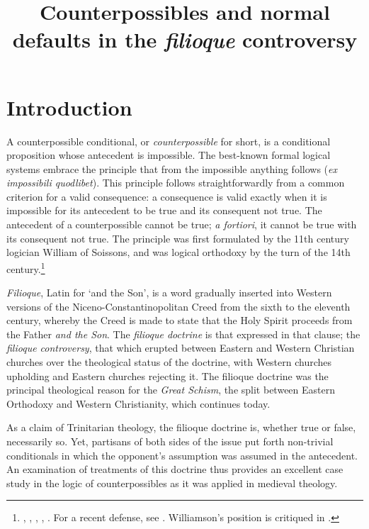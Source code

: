 \documentclass[]{article}
\title{Counterpossibles and normal defaults in the \textit{filioque} controversy}
\author{}
\begin{document}
\maketitle

\section{Introduction}
A counterpossible conditional, or \textit{counterpossible} for short, is a conditional proposition whose antecedent is impossible. The best-known formal logical systems embrace the principle that from the impossible anything follows (\textit{ex impossibili quodlibet}). This principle follows straightforwardly from a common criterion for a valid consequence: a consequence is valid exactly when it is impossible for its antecedent to be true and its consequent not true. The antecedent of a counterpossible cannot be true; \textit{a fortiori}, it cannot be true with its consequent not true. The principle was first formulated by the 11th century logician William of Soissons,\autocite{Martin1986} and was logical orthodoxy by the turn of the 14th century.\footnote{\autocite[10, par. 32]{Green-Pedersen1980a}, \autocite[128-129, par. 70]{Green-Pedersen1980b}, \autocite[pp. 61, 248]{BurleyDPAL}, \autocite[III. 3. 38, pp. 727-731]{OckhamSL}, \autocite[I. 8, 1st conclusion]{Buridan2015}. For a recent defense, see \autocite{Williamson2016}. Williamson's position is critiqued in \autocite{French2017}.}

\textit{Filioque}, Latin for `and the Son', is a word gradually inserted into Western versions of the Niceno-Constantinopolitan Creed from the sixth to the eleventh century, whereby the Creed is made to state that the Holy Spirit proceeds from the Father \textit{and the Son}. The \textit{filioque doctrine} is that expressed in that clause; the \textit{filioque controversy}, that which erupted between Eastern and Western Christian churches over the theological status of the doctrine, with Western churches upholding and Eastern churches rejecting it. The filioque doctrine was the principal theological reason for the \textit{Great Schism}, the split between Eastern Orthodoxy and Western Christianity, which continues today.

As a claim of Trinitarian theology, the filioque doctrine is, whether true or false, necessarily so. Yet, partisans of both sides of the issue put forth non-trivial conditionals in which the opponent’s assumption was assumed in the antecedent. An examination of treatments of this doctrine thus provides an excellent case study in the logic of counterpossibles as it was applied in medieval theology.
\end{document}
